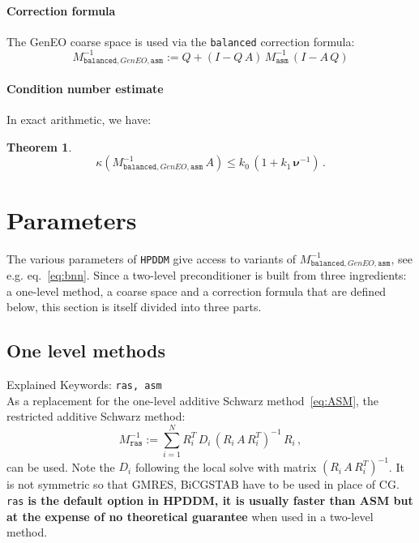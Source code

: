\documentclass{article}
\newtheorem{theorem}{Theorem}[section]
\begin{document}
\paragraph{Correction formula}
The GenEO coarse space is used via the \texttt{balanced} correction formula:
\begin{equation}
  \label{eq:bnnGenEO}
  \boxed{
 M_{\texttt{balanced},GenEO,\texttt{asm}}^{-1} := Q+(I-Q\,A)\,M_{\texttt{asm}}^{-1}\,(I-A\,Q)
 }
\end{equation}

\paragraph{Condition number estimate} 
In exact arithmetic, we have:
\begin{theorem}
	\label{th:geneo}
\[
 \kappa(M_{\texttt{balanced},GenEO,\texttt{asm}}^{-1}\,A) \le k_0\,(1+k_1\,\boldsymbol{\nu}^{-1})\,.
\]
\end{theorem}

\section{Parameters}
	\label{sec:parameters}
The various parameters of \texttt{HPDDM} give access to variants of $M_{\texttt{balanced},GenEO,\texttt{asm}}^{-1}$, see e.g.  eq.~\eqref{eq:bnn}. Since a two-level preconditioner is built from three ingredients: a one-level method, a coarse space and a correction formula that are defined below, this section is itself divided into three parts. 


\subsection{One level methods}
Explained Keywords: \texttt{ras, asm}\\


As a replacement for the one-level additive Schwarz method~\eqref{eq:ASM}, the restricted additive Schwarz method:
 \begin{equation}
    \label{eq:ASM}\boxed{
    M_{\texttt{ras}}^{-1} := \sum_{i=1}^N R_i^T\,D_i\,(R_i\,A\,R_i^T)^{-1}\,R_i\,,
    }
 \end{equation}
 can be used. Note the $D_i$ following the local solve with matrix $(R_i\,A\,R_i^T)^{-1}$. It is not symmetric so that GMRES, BiCGSTAB have to be used in place of CG. \texttt{ras} {\bf is the default option in HPDDM, it is usually faster than ASM but at the expense of no theoretical guarantee} when used in a two-level method.  
\end{document}
